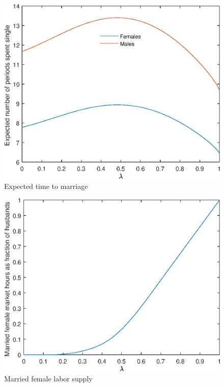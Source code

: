 \documentclass[12pt]{article}
\begin{document}
\begin{figure}
	\centering
	\caption{Expected time to marriage}
	\includegraphics{Graphs/exp_single_lambda_ex1.eps}
\end{figure}

\begin{figure}
	\centering
	\caption{Married female labor supply}
	\includegraphics{Graphs/lf_lambda_ex1.eps}
\end{figure}
\end{document}
